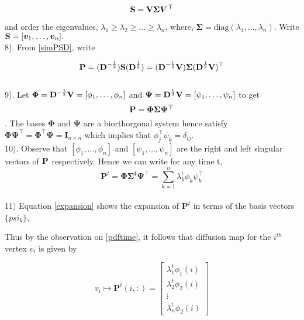 \begin{equation}
\textbf{S} = \textbf{V}\bm{\Sigma}\bm{V^{\top}}
\end{equation}

and order the eigenvalues, $\lambda_{1}\geq \lambda_{2} \geq \ldots \geq \lambda_{n}$, where,  
$\bm{\Sigma} = \text{diag}(\lambda_{1}, \ldots, \lambda_{n})$. Write 
$\textbf{S} = [\boldsymbol{v}_{1}, \ldots, \boldsymbol{v}_{n}].$\\

8). From \eqref{simPSD}, write 

\[\textbf{P} = (\textbf{D}^{-\frac{1}{2}}) \textbf{S} (\textbf{D}^{\frac{1}{2}} ) = 
 (\textbf{D}^{-\frac{1}{2}} \textbf{V}) \bm{\Sigma} (\textbf{D}^{\frac{1}{2}} \textbf{V} )^{\top}
\] \\
9). Let $\bm{\Phi} = \textbf{D}^{-\frac{1}{2}} \textbf{V}  = [\phi_{1}, \ldots, \phi_{n}]$ and 
$\bm{\Psi} = \textbf{D}^{\frac{1}{2}} \textbf{V} = [\psi_{1}, \ldots, \psi_{n}] $
to get  
\[\textbf{P} = \bm{\Phi \Sigma \Psi^{\top}}
\].
The bases $\bm{\Phi}$ and $\bm{\Psi}$ are a biorthorgonal system hence satisfy
$ \bm{\Phi}\bm{\Psi}^{\top} =  \bm{\Phi}^{\top}\bm{\Psi}  = \bm{I}_{n \times n}$
which implies that $\phi_{j}^{\top}\psi_{k} = \delta_{ij}$.\\
10). Observe that  $[\phi_{1}, \ldots, \phi_{n}]$ and $[\psi_{1}, \ldots, \psi_{n}]$ are the right and left singular vectors of $\textbf{P}$ respectively.
Hence we can write for any time t,
\begin{equation}\label{expansion}
 \bm{P}^{t} = \bm{\Phi \Sigma^{t} \Psi^{\top}} = \displaystyle \sum_{k=1}^{n} \lambda_{k}^{t} \phi_{k} \psi_{k}^{\top}
\end{equation} \\

11) Equation \eqref{expansion} shows the expansion of $\bm{P}^{t}$ 
in terms of  the basis vectors $\{psi_{k}\}$, 

Thus by the observation on \ref{pdftime}, it follows that diffusion map
for the $i^{th}$ vertex $v_{i}$ is given by

$$ v_{i} \mapsto \bm{P}^{t}(i,:) = \begin{bmatrix}
         \lambda_{1}^{t}\phi_{1}(i)\\
         \lambda_{2}^{t}\phi_{2}(i)\\
         \vdots\\
         \lambda_{n}^{t}\phi_{2}(i)
        \end{bmatrix} $$
        
